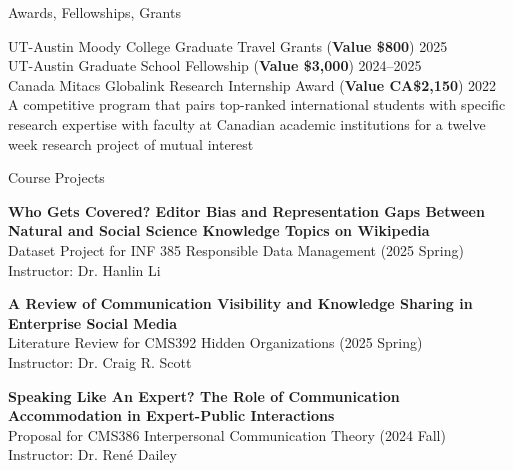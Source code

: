 \documentclass[
	11pt, %
]{resume} %
\begin{document}
\begin{rSection}{Awards, Fellowships, Grants}
	
	UT-Austin Moody College Graduate Travel Grants (\textbf{Value \$800})  \hfill 2025\\
	UT-Austin Graduate School Fellowship   (\textbf{Value \$3,000})  \hfill 2024--2025\\
    Canada Mitacs Globalink Research Internship Award     (\textbf{Value CA\$2,150})  \hfill 2022\\
\textbullet\enspace  A competitive program that pairs top-ranked international students with specific research expertise with faculty at Canadian academic institutions for a twelve week research project of mutual interest\\
	
\end{rSection}


\begin{rSection}{Course Projects}

	\textbf{Who Gets Covered? Editor Bias and Representation Gaps Between Natural and Social Science Knowledge Topics on Wikipedia} \\
    Dataset Project for INF 385 Responsible Data Management (2025 Spring)\\ Instructor: Dr. Hanlin Li 
    
	\textbf{A Review of Communication Visibility and Knowledge Sharing in Enterprise Social Media}\\
    Literature Review for CMS392 Hidden Organizations (2025 Spring)\\
    Instructor: Dr. Craig R. Scott 
	

	\textbf{Speaking Like An Expert? The Role of Communication Accommodation in Expert-Public Interactions}\\
    Proposal for CMS386 Interpersonal Communication Theory (2024 Fall)\\
    Instructor: Dr. René Dailey\\

	
\end{rSection}


\end{document}
